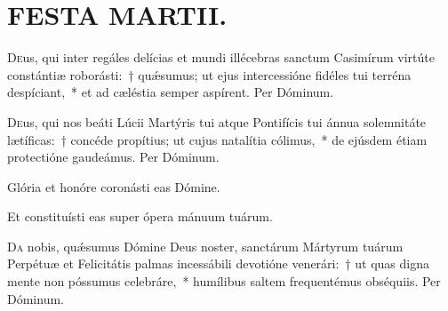\documentclass[vesperale_romanum.tex]{subfiles}
\begin{document}

\section[Festa Martii]{FESTA MARTII.}


\semiduplex

\oratio

\lettrine{D}{e}us, qui inter regáles delícias et mundi illécebras sanctum Casimírum virtúte constántiæ roborásti:~† quǽsumus; ut ejus intercessióne fidéles tui terréna despíciant,~* et ad cæléstia semper aspírent.
Per Dóminum.

\quadcommferiae


\oratio

\lettrine{D}{e}us, qui nos beáti Lúcii Martýris tui atque Pontifícis tui ánnua solemnitáte lætíficas:~† concéde propítius; ut cujus natalítia cólimus,~* de ejúsdem étiam protectióne gaudeámus. Per Dóminum.

\capitdeseqquad

\myrule


\duplex



\vv Glória et honóre coronásti eas Dómine.

\rr Et constituísti eas super ópera mánuum tuárum.

\oratio

\lettrine{D}{a} nobis, quǽsumus Dómine Deus noster, sanctárum Mártyrum tuárum Perpétuæ et Felicitátis palmas incessábili devotióne venerári:~† ut quas digna mente non póssumus celebráre,~* humílibus saltem frequentémus obséquiis. Per Dóminum.

\capitdeseqquad

\myrule
\end{document}
